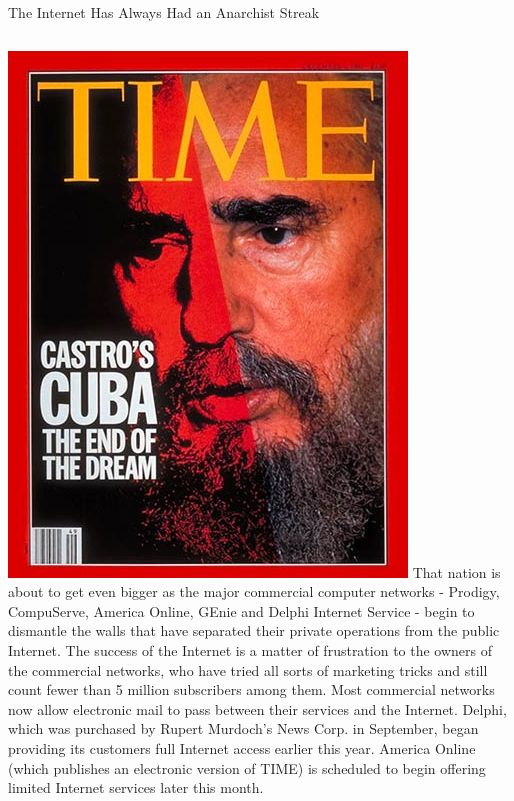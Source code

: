 \documentclass[nobackground,dvipsnames,table]{beamer}
\begin{document}
\begin{frame}{The Internet Has Always Had an Anarchist Streak}
    \begin{columns}[c]
            \includegraphics[width=\textwidth]{time-castro}
            \scriptsize
            That nation is about to get even bigger as the major commercial computer networks - Prodigy, CompuServe, America Online, GEnie and Delphi Internet Service - begin to dismantle the walls that have separated their private operations from the public Internet. The success of the Internet is a matter of frustration to the owners of the commercial networks, who have tried all sorts of marketing tricks and still count fewer than 5 million subscribers among them. Most commercial networks now allow electronic mail to pass between their services and the Internet. Delphi, which was purchased by Rupert Murdoch's News Corp. in September, began providing its customers full Internet access earlier this year. America Online (which publishes an electronic version of TIME) is scheduled to begin offering limited Internet services later this month.\\~\\
            

\end{columns}
\end{frame}
\end{document}
